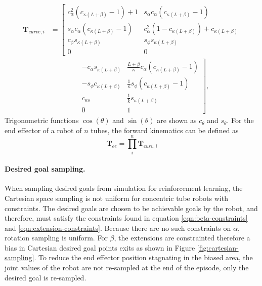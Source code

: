\begin{equation}\label{eqn:curvature-transformation}
\begin{aligned}
\textbf{T}_{curve,i} &=
\left[\begin{matrix}
  c^2_\alpha (c_{\kappa  \left(L+\beta\right)} - 1) + 1 & s_\alpha c_\alpha (c_{\kappa  \left(L+\beta\right)} - 1) \\
  s_\alpha c_\alpha (c_{\kappa  \left(L+\beta\right)} - 1) & c^2_\alpha (1 - c_{\kappa  \left(L+\beta\right)}) + c_{\kappa  \left(L+\beta\right)} \\
  c_{\phi} s_{\kappa  \left(L+\beta\right)} & s_{\phi} s_{\kappa  \left(L+\beta\right)} \\
  0 & 0
\end{matrix}\right.\\
&\qquad\qquad
\left.\begin{matrix}
  - c_\alpha s_{\kappa  \left(L+\beta\right)}  & \frac{L+\beta}{\kappa} c_\alpha (c_{\kappa \left(L+\beta\right)} - 1) \\
  - s_\phi c_{\kappa \left(L+\beta\right)} & \frac{1}{\kappa} s_\phi (c_{\kappa  \left(L+\beta\right)} - 1) \\
  c_{\kappa s} & \frac{1}{k} s_{\kappa  \left(L+\beta\right)} \\
  0 & 1
\end{matrix}\right],
\end{aligned}
\end{equation}
Trigonometric functions $\cos\left( \theta \right)$ and $\sin\left( \theta \right)$ are shown as $c_{\theta}$ and $s_{\theta}$. For the end effector of a robot of $n$ tubes, the forward kinematics can be defined as
\begin{equation}
\textbf{T}_{ee} = \prod^{n}_{i} \textbf{T}_{curv,i} \label{eqn:end-effector-transformation}
\end{equation}

\paragraph{Desired goal sampling.} When sampling desired goals from simulation for reinforcement learning, the Cartesian space sampling is not uniform for concentric tube robots with constraints. The desired goals are chosen to be achievable goals by the robot, and therefore, must satisfy the constraints found in equation \ref{eqn:beta-constraints} and \ref{eqn:extension-constraints}. Because there are no such constraints on $\alpha$, rotation sampling is uniform. For $\beta$, the extensions are constrainted therefore a bias in Cartesian desired goal points exits as shown in Figure \ref{fig:cartesian-sampling}. To reduce the end effector position stagnating in the biased area, the joint values of the robot are not re-sampled at the end of the episode, only the desired goal is re-sampled.

